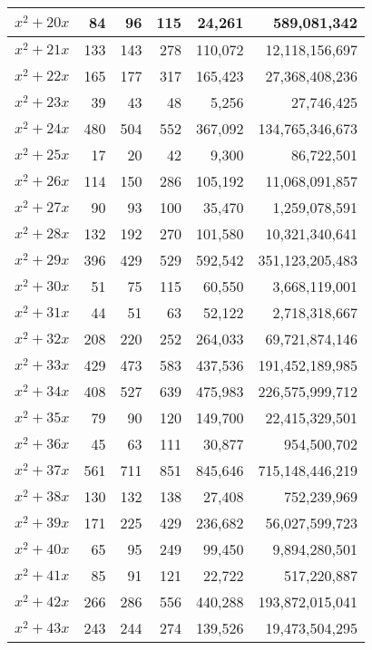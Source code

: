 \documentclass[a4paper]{amsproc}
\theoremstyle{plain}
\begin{document}
\begin{longtable}{ | l | r | r | r | r | r | }
$x^2 + 20x$ & 84 & 96 & 115 & 24{,}261 & 589{,}081{,}342 \\ \hline
$x^2 + 21x$ & 133 & 143 & 278 & 110{,}072 & 12{,}118{,}156{,}697 \\ \hline
$x^2 + 22x$ & 165 & 177 & 317 & 165{,}423 & 27{,}368{,}408{,}236 \\ \hline
$x^2 + 23x$ & 39 & 43 & 48 & 5{,}256 & 27{,}746{,}425 \\ \hline
$x^2 + 24x$ & 480 & 504 & 552 & 367{,}092 & 134{,}765{,}346{,}673 \\ \hline
$x^2 + 25x$ & 17 & 20 & 42 & 9{,}300 & 86{,}722{,}501 \\ \hline
$x^2 + 26x$ & 114 & 150 & 286 & 105{,}192 & 11{,}068{,}091{,}857 \\ \hline
$x^2 + 27x$ & 90 & 93 & 100 & 35{,}470 & 1{,}259{,}078{,}591 \\ \hline
$x^2 + 28x$ & 132 & 192 & 270 & 101{,}580 & 10{,}321{,}340{,}641 \\ \hline
$x^2 + 29x$ & 396 & 429 & 529 & 592{,}542 & 351{,}123{,}205{,}483 \\ \hline
$x^2 + 30x$ & 51 & 75 & 115 & 60{,}550 & 3{,}668{,}119{,}001 \\ \hline
$x^2 + 31x$ & 44 & 51 & 63 & 52{,}122 & 2{,}718{,}318{,}667 \\ \hline
$x^2 + 32x$ & 208 & 220 & 252 & 264{,}033 & 69{,}721{,}874{,}146 \\ \hline
$x^2 + 33x$ & 429 & 473 & 583 & 437{,}536 & 191{,}452{,}189{,}985 \\ \hline
$x^2 + 34x$ & 408 & 527 & 639 & 475{,}983 & 226{,}575{,}999{,}712 \\ \hline
$x^2 + 35x$ & 79 & 90 & 120 & 149{,}700 & 22{,}415{,}329{,}501 \\ \hline
$x^2 + 36x$ & 45 & 63 & 111 & 30{,}877 & 954{,}500{,}702 \\ \hline
$x^2 + 37x$ & 561 & 711 & 851 & 845{,}646 & 715{,}148{,}446{,}219 \\ \hline
$x^2 + 38x$ & 130 & 132 & 138 & 27{,}408 & 752{,}239{,}969 \\ \hline
$x^2 + 39x$ & 171 & 225 & 429 & 236{,}682 & 56{,}027{,}599{,}723 \\ \hline
$x^2 + 40x$ & 65 & 95 & 249 & 99{,}450 & 9{,}894{,}280{,}501 \\ \hline
$x^2 + 41x$ & 85 & 91 & 121 & 22{,}722 & 517{,}220{,}887 \\ \hline
$x^2 + 42x$ & 266 & 286 & 556 & 440{,}288 & 193{,}872{,}015{,}041 \\ \hline
$x^2 + 43x$ & 243 & 244 & 274 & 139{,}526 & 19{,}473{,}504{,}295 \\ \hline

\end{longtable}
\end{document}

